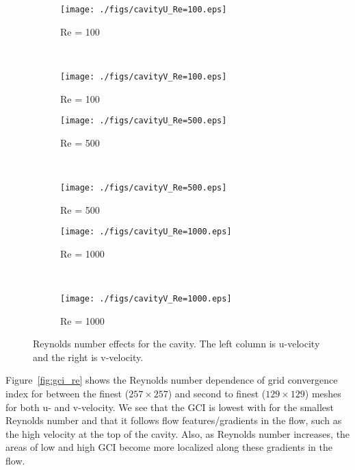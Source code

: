\documentclass[10pt, letterpaper]{article}
\newcommand{\mesh}[1]{${#1} \times {#1}$}
\begin{document}
\begin{figure}
	\centering
	\begin{subfigure}[b]{0.475\textwidth}
		\centering
		\texttt{[image: ./figs/cavityU\_Re=100.eps]}
		\caption{Re = 100}
	\end{subfigure}
	~
	\begin{subfigure}[b]{0.475\textwidth}
		\centering
		\texttt{[image: ./figs/cavityV\_Re=100.eps]}
		\caption{Re = 100}
	\end{subfigure}
	
	\begin{subfigure}[b]{0.475\textwidth}
		\centering
		\texttt{[image: ./figs/cavityU\_Re=500.eps]}
		\caption{Re = 500}
	\end{subfigure}
	~
	\begin{subfigure}[b]{0.475\textwidth}
		\centering
		\texttt{[image: ./figs/cavityV\_Re=500.eps]}
		\caption{Re = 500}
	\end{subfigure}
	
	\begin{subfigure}[b]{0.475\textwidth}
		\centering
		\texttt{[image: ./figs/cavityU\_Re=1000.eps]}
		\caption{Re = 1000}
	\end{subfigure}
	~
	\begin{subfigure}[b]{0.475\textwidth}
		\centering
		\texttt{[image: ./figs/cavityV\_Re=1000.eps]}
		\caption{Re = 1000}
	\end{subfigure}
	\caption{Reynolds number effects for the cavity.  The left column
		    is u-velocity and the right is v-velocity.}
	\label{fig:cavity_Re_effects}
\end{figure}

Figure~\ref{fig:gci_re} shows the Reynolds number dependence of grid
convergence index for between the finest (\mesh{257}) and second to finest
(\mesh{129}) meshes for both u- and v-velocity.  We see that the GCI is lowest
with for the smallest Reynolds number and that it follows flow features/gradients
in the flow, such as the high velocity at the top of the cavity.  Also,
as Reynolds number increases, the areas of low and high GCI become more localized
along these gradients in the flow.
\end{document}

